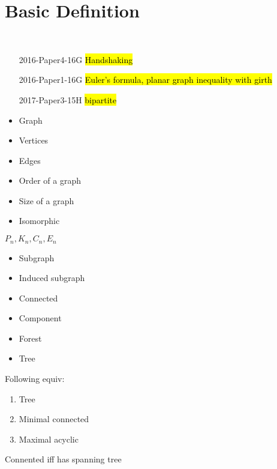 \section{Basic Definition}\label{sec:basic-definition}

\begin{exam}
    \,
    \begin{enumerate}
        \item[2016-Paper4-16G] \hl{Handshaking}
        \item[2016-Paper1-16G] \hl{Euler's formula, planar graph inequality with girth}
        \item[2017-Paper3-15H] \hl{bipartite}
    \end{enumerate}
\end{exam}

\begin{itemize}
    \item Graph
    \item Vertices
    \item Edges
    \item Order of a graph
    \item Size of a graph
    \item Isomorphic
\end{itemize}

\begin{example}
    $P_n, K_n, C_n, E_n$
\end{example}

\begin{itemize}
    \item Subgraph
    \item Induced subgraph
    \item Connected
    \item Component
    \item Forest
    \item Tree
\end{itemize}

\begin{thm}
    Following equiv:
    \begin{enumerate}
        \item Tree
        \item Minimal connected
        \item Maximal acyclic
    \end{enumerate}
\end{thm}

\begin{thm}
   Connented iff has spanning tree
\end{thm}

